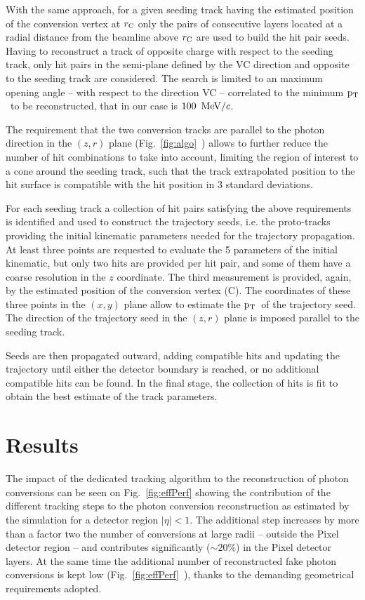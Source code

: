 \documentclass[a4paper]{jpconf}
\def \pt{$\p_{\rm T}$~}
\begin{document}
With the same approach, for a given seeding track  having  the estimated position of the conversion vertex at  $r\rm _C$ only the pairs of consecutive layers located at a radial distance from the beamline above $r\rm _C$ are used to build the hit pair seeds. 
%
Having to reconstruct a track of opposite charge with respect to the seeding track, only hit pairs in the semi-plane defined by the VC direction and opposite to the seeding track are considered. The search is limited to an maximum opening angle -- with respect to the direction VC -- correlated to the minimum \pt to be reconstructed, that in our case is $100~{\rm \, MeV}/c$.

The requirement that the two conversion tracks are parallel to the photon direction in the $(z,r)$ plane (Fig.~\ref{fig:algo}~) allows to further   reduce the number of hit combinations to take into account, limiting the region of interest to a cone around the seeding track, such that the track extrapolated position to the hit surface is compatible with the hit position in 3 standard deviations.  


For each seeding track a collection of hit pairs satisfying the above requirements  is identified and used to construct the trajectory seeds, i.e. the proto-tracks providing the initial kinematic parameters needed for the trajectory propagation.
At least three points are requested to evaluate the 5 parameters of the initial kinematic, but only two hits are provided per hit pair, and some of them have a coarse resolution in the $z$ coordinate. The third measurement is provided, again, by the   estimated position of the conversion vertex (C). The coordinates of these three points in the $(x,y)$ plane allow to estimate the \pt of the trajectory seed. The direction of the trajectory seed in the $(z,r)$ plane is imposed parallel to the seeding track.

Seeds are then
propagated outward, adding compatible hits and updating the trajectory
until either the detector boundary is reached, or no additional
compatible hits can be found.  In the final stage, the collection of
hits is fit to obtain the best estimate of the track parameters.

\section{Results}

The impact of the dedicated tracking algorithm  to the reconstruction of photon conversions
 can be seen on Fig.~\ref{fig:effPerf} 
showing the contribution of the different tracking steps to the photon conversion
reconstruction as estimated by the simulation  for a detector region  $|\eta|<1$.
The additional step increases by more than a factor two the number of conversions at large radii -- outside the Pixel detector region -- and contributes significantly ($\sim 20\%$) in the Pixel detector layers. 
 At the same time the additional number of reconstructed fake photon conversions is kept low (Fig.~\ref{fig:effPerf}~), thanks to the demanding geometrical requirements adopted.
 
\end{document}
